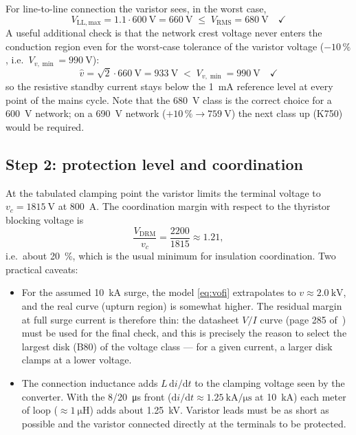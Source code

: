 \documentclass[11pt,a4paper]{article}
\begin{document}
For line-to-line connection the varistor sees, in the worst case,
%
\begin{equation}
  V_\mathrm{LL,max} = 1.1 \cdot \SI{600}{\volt} = \SI{660}{\volt}
  \;\leq\; V_\mathrm{RMS} = \SI{680}{\volt} \quad \checkmark
\end{equation}
%
A useful additional check is that the network crest voltage never enters the
conduction region even for the worst-case tolerance of the varistor voltage
($-10\,\%$, i.e.\ $V_{v,\min} = \SI{990}{\volt}$):
%
\begin{equation}
  \hat v = \sqrt{2}\cdot \SI{660}{\volt} = \SI{933}{\volt}
  \;<\; V_{v,\min} = \SI{990}{\volt} \quad \checkmark
\end{equation}
%
so the resistive standby current stays below the \SI{1}{\milli\ampere}
reference level at every point of the mains cycle. Note that the
\SI{680}{\volt} class is the correct choice for a \SI{600}{\volt} network;
on a \SI{690}{\volt} network ($+10\,\% \rightarrow \SI{759}{\volt}$) the
next class up (K750) would be required.

\subsection{Step 2: protection level and coordination}

At the tabulated clamping point the varistor limits the terminal voltage to
$v_c = \SI{1815}{\volt}$ at \SI{800}{\ampere}. The coordination margin with
respect to the thyristor blocking voltage is
%
\begin{equation}
  \frac{V_\mathrm{DRM}}{v_c} = \frac{2200}{1815} \approx 1.21 ,
\end{equation}
%
i.e.\ about \SI{20}{\percent}, which is the usual minimum for insulation
coordination. Two practical caveats:
%
\begin{itemize}
  \item For the assumed \SI{10}{\kilo\ampere} surge, the model
  \eqref{eq:vofi} extrapolates to $v \approx \SI{2.0}{\kilo\volt}$, and the
  real curve (upturn region) is somewhat higher. The residual margin at full
  surge current is therefore thin: the datasheet $V/I$ curve (page 285
  of~\cite{epcos2002}) must be used for the final check, and this is
  precisely the reason to select the largest disk (B80) of the voltage
  class --- for a given current, a larger disk clamps at a lower voltage.
  \item The connection inductance adds $L\,\mathrm{d}i/\mathrm{d}t$ to the
  clamping voltage seen by the converter. With the 8/20~\si{\micro\second}
  front ($\mathrm{d}i/\mathrm{d}t \approx \SI{1.25}{\kilo\ampere\per\micro\second}$
  at \SI{10}{\kilo\ampere}) each meter of loop (\(\approx\SI{1}{\micro\henry}\))
  adds about \SI{1.25}{\kilo\volt}. Varistor leads must be as short as
  possible and the varistor connected directly at the terminals to be
  protected.
\end{itemize}
\end{document}

